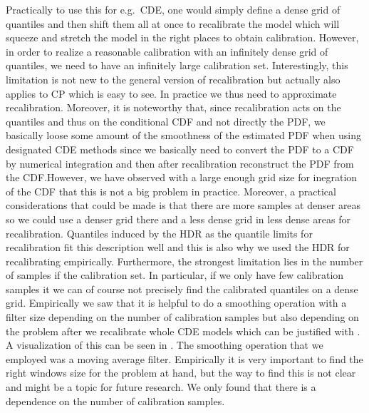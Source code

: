 Practically to use this for e.g.\ CDE, one would simply define a dense grid of quantiles and then shift them all at once to recalibrate the model which will squeeze and stretch the model in the right places to obtain calibration. However, in order to realize a reasonable calibration with an infinitely dense grid of quantiles, we need to have an infinitely large calibration set. Interestingly, this limitation is not new to the general version of recalibration but actually also applies to CP which is easy to see. In practice we thus need to approximate recalibration. Moreover, it is noteworthy that, since recalibration acts on the quantiles and thus on the conditional CDF and not directly the PDF, we basically loose some amount of the smoothness of the estimated PDF when using designated CDE methods since we basically need to convert the PDF to a CDF by numerical integration and then after recalibration reconstruct the PDF from the CDF.\@ However, we have observed with a large enough grid size for inegration of the CDF that this is not a big problem in practice. Moreover, a practical considerations that could be made is that there are more samples at denser areas so we could use a denser grid there and a less dense grid in less dense areas for recalibration. Quantiles induced by the HDR as the quantile limits for recalibration fit this description well and this is also why we used the HDR for recalibrating empirically. Furthermore, the strongest limitation lies in the number of samples if the calibration set. In particular, if we only have few calibration samples it we can of course not precisely find the calibrated quantiles on a dense grid. Empirically we saw that it is helpful to do a smoothing operation with a filter size depending on the number of calibration samples but also depending on the problem after we recalibrate whole CDE models which can be justified with . A visualization of this can be seen in . The smoothing operation that we employed was a moving average filter. Empirically it is very important to find the right windows size for the problem at hand, but the way to find this is not clear and might be a topic for future research. We only found that there is a dependence on the number of calibration samples.

